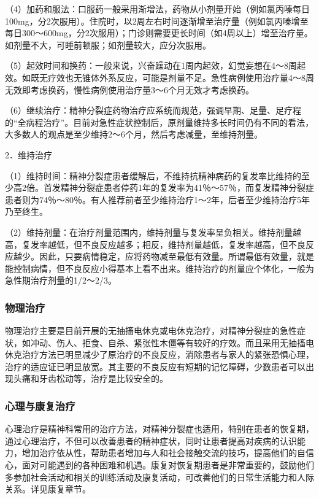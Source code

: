 （4）加药和服法：口服药一般采用渐增法，药物从小剂量开始（例如氯丙嗪每日100mg，分2次服用）。住院时，以2周左右时间逐渐增至治疗量（例如氯丙嗪增至每日300～600mg，分2次服用）；门诊则需要更长时间（如4周以上）增至治疗量。如剂量不大，可睡前顿服；如剂量较大，应分次服用。

（5）起效时间和换药：一般来说，兴奋躁动在1周内起效，幻觉妄想在4～8周起效。如既无疗效也无锥体外系反应，可能是剂量不足。急性病例使用治疗量4～8周无效即考虑换药，慢性病例使用治疗量3～6个月无效才考虑换药。

（6）继续治疗：精神分裂症药物治疗应系统而规范，强调早期、足量、足疗程的``全病程治疗''。目前对急性症状控制后，原剂量维持多长时间仍有不同的看法，大多数人的观点是至少维持2～6个月，然后考虑减量，至维持剂量。

2．维持治疗

（1）维持时间：精神分裂症患者缓解后，不维持抗精神病药的复发率比维持的至少高2倍。首发精神分裂症患者停药1年的复发率为41％～57％，而复发精神分裂症患者则为74％～80％。有人推荐前者至少维持治疗1～2年，后者至少维持治疗5年乃至终生。

（2）维持剂量：在治疗剂量范围内，维持剂量与复发率呈负相关。维持剂量越高，复发率越低，但不良反应越多；相反，维持剂量越低，复发率越高，但不良反应越少。因此，只要病情稳定，应将药物减至最低有效量。所谓最低有效量，就是能控制病情，但不良反应小得基本上看不出来。维持治疗的剂量应个体化，一般为急性期治疗剂量的1/2～2/3。

\subsubsection{物理治疗}

物理治疗主要是目前开展的无抽搐电休克或电休克治疗，对精神分裂症的急性症状，如冲动、伤人、拒食、自杀、紧张性木僵等有较好的疗效。而且采用无抽搐电休克治疗方法已明显减少了原治疗的不良反应，消除患者与家人的紧张恐惧心理，治疗的适应证已明显放宽。其主要的不良反应有短期的记忆障碍，少数患者可以出现头痛和牙齿松动等，治疗是比较安全的。

\subsubsection{心理与康复治疗}

心理治疗是精神科常用的治疗方法，对精神分裂症也适用，特别在患者的恢复期，通过心理治疗，不但可以改善患者的精神症状，同时让患者提高对疾病的认识能力，增加治疗依从性，帮助患者增加与人和社会接触交流的技巧，提高他们的自信心，面对可能遇到的各种困难和机遇。康复对恢复期患者是非常重要的，鼓励他们多参加社会活动和相关的训练活动及康复活动，可改善他们的日常生活能力和人际关系。详见康复章节。

